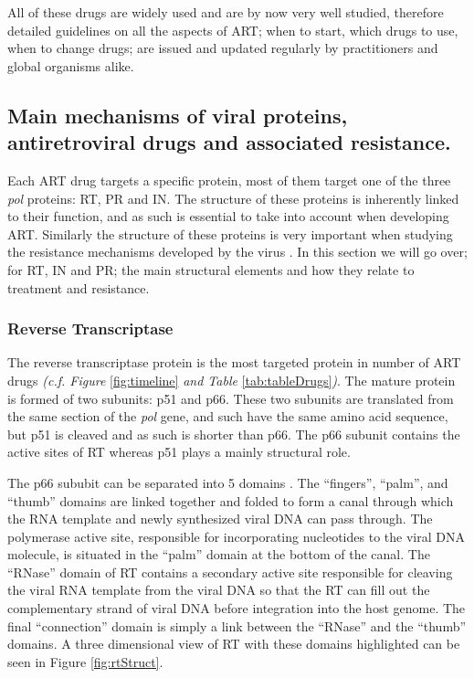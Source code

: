\documentclass[
  11pt,
  twoside]{scrbook}
\begin{document}
All of these drugs are widely used and are by now very well studied, therefore detailed guidelines on all the aspects of ART; when to start, which drugs to use, when to change drugs; are issued and updated regularly by practitioners \autocite{zolopaEvolutionHIVTreatment2010} and global organisms \autocite{worldhealthorganizationConsolidatedGuidelinesHIV2021} alike.

\hypertarget{drug-mechanisms}{%
\subsection{Main mechanisms of viral proteins, antiretroviral drugs and associated resistance.}\label{drug-mechanisms}}

Each ART drug targets a specific protein, most of them target one of the three \emph{pol} proteins: RT, PR and IN. The structure of these proteins is inherently linked to their function, and as such is essential to take into account when developing ART. Similarly the structure of these proteins is very important when studying the resistance mechanisms developed by the virus \autocite{ammaranondMechanismHIVAntiretroviral2012,clavelHIVDrugResistance2004}. In this section we will go over; for RT, IN and PR; the main structural elements and how they relate to treatment and resistance.

\hypertarget{reverse-transcriptase}{%
\subsubsection{Reverse Transcriptase}\label{reverse-transcriptase}}

The reverse transcriptase protein is the most targeted protein in number of ART drugs \emph{(c.f. Figure} \ref{fig:timeline} \emph{and Table} \ref{tab:tableDrugs}\emph{)}. The mature protein is formed of two subunits: p51 and p66. These two subunits are translated from the same section of the \emph{pol} gene, and such have the same amino acid sequence, but p51 is cleaved and as such is shorter than p66. The p66 subunit contains the active sites of RT whereas p51 plays a mainly structural role.

The p66 sububit can be separated into 5 domains \autocite{sarafianosStructureFunctionHIV12009}. The ``fingers'', ``palm'', and ``thumb'' domains are linked together and folded to form a canal through which the RNA template and newly synthesized viral DNA can pass through. The polymerase active site, responsible for incorporating nucleotides to the viral DNA molecule, is situated in the ``palm'' domain at the bottom of the canal. The ``RNase'' domain of RT contains a secondary active site responsible for cleaving the viral RNA template from the viral DNA so that the RT can fill out the complementary strand of viral DNA before integration into the host genome. The final ``connection'' domain is simply a link between the ``RNase'' and the ``thumb'' domains. A three dimensional view of RT with these domains highlighted can be seen in Figure \ref{fig:rtStruct}.
\end{document}
